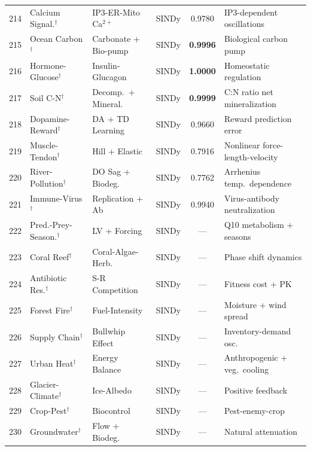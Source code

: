 \begin{table}[t]
\begin{tabular}{rlllcl}
214 & Calcium Signal.$^\dagger$ & IP3-ER-Mito Ca$^{2+}$ & SINDy & 0.9780 & IP3-dependent oscillations \\
215 & Ocean Carbon$^\dagger$ & Carbonate + Bio-pump & SINDy & \textbf{0.9996} & Biological carbon pump \\
216 & Hormone-Glucose$^\dagger$ & Insulin-Glucagon & SINDy & \textbf{1.0000} & Homeostatic regulation \\
217 & Soil C-N$^\dagger$ & Decomp.\ + Mineral. & SINDy & \textbf{0.9999} & C:N ratio net mineralization \\
218 & Dopamine-Reward$^\dagger$ & DA + TD Learning & SINDy & 0.9660 & Reward prediction error \\
219 & Muscle-Tendon$^\dagger$ & Hill + Elastic & SINDy & 0.7916 & Nonlinear force-length-velocity \\
220 & River-Pollution$^\dagger$ & DO Sag + Biodeg. & SINDy & 0.7762 & Arrhenius temp.\ dependence \\
221 & Immune-Virus$^\dagger$ & Replication + Ab & SINDy & 0.9940 & Virus-antibody neutralization \\
222 & Pred.-Prey-Season.$^\dagger$ & LV + Forcing & SINDy & --- & Q10 metabolism + seasons \\
223 & Coral Reef$^\dagger$ & Coral-Algae-Herb. & SINDy & --- & Phase shift dynamics \\
224 & Antibiotic Res.$^\dagger$ & S-R Competition & SINDy & --- & Fitness cost + PK \\
225 & Forest Fire$^\dagger$ & Fuel-Intensity & SINDy & --- & Moisture + wind spread \\
226 & Supply Chain$^\dagger$ & Bullwhip Effect & SINDy & --- & Inventory-demand osc. \\
227 & Urban Heat$^\dagger$ & Energy Balance & SINDy & --- & Anthropogenic + veg.\ cooling \\
228 & Glacier-Climate$^\dagger$ & Ice-Albedo & SINDy & --- & Positive feedback \\
229 & Crop-Pest$^\dagger$ & Biocontrol & SINDy & --- & Pest-enemy-crop \\
230 & Groundwater$^\dagger$ & Flow + Biodeg. & SINDy & --- & Natural attenuation \\
\bottomrule
\end{tabular}
\end{table}